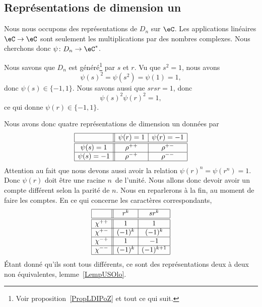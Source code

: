 \subsection{Représentations de dimension un}

Nous nous occupons des représentations de \( D_n\) sur \( \eC\). Les applications linéaires \( \eC\to \eC\) sont seulement les multiplications par des nombres complexes. Nous cherchons donc \( \psi\colon D_n\to \eC^*\).

Nous savons que \( D_n\) est généré\footnote{Voir proposition~\ref{PropLDIPoZ} et tout ce qui suit.} par \( s\) et \( r\). Vu que \( s^2=1\), nous avons
\begin{equation}
    \psi(s)^2=\psi(s^2)=\psi(1)=1,
\end{equation}
donc \( \psi(s)\in\{ -1,1 \}\). Nous savons aussi que \( srsr=1\), donc
\begin{equation}
    \psi(s)^2\psi(r)^2=1,
\end{equation}
ce qui donne \( \psi(r)\in\{ -1,1 \}\).

Nous avons donc quatre représentations de dimension un données par
\begin{equation*}
    \begin{array}[]{|c||c|c|}
        \hline
        &\psi(r)=1&\psi(r)=-1\\
        \hline\hline
        \psi(s)=1&\rho^{++}&\rho^{+-}\\
        \hline
        \psi(s)=-1&\rho^{-+}&\rho^{--}\\
        \hline
    \end{array}
\end{equation*}
Attention au fait que nous devons aussi avoir la relation \( \psi(r)^n=\psi(r^n)=1\). Donc \( \psi(r)\) doit être une racine \( n\)\ieme\ de l'unité. Nous allons donc devoir avoir un compte différent selon la parité de \( n\). Nous en reparlerons à la fin, au moment de faire les comptes. En ce qui concerne les caractères correspondants,
\begin{equation*}
    \begin{array}[]{|c||c|c|}
        \hline
        &r^k&sr^k\\
        \hline\hline
        \chi^{++}&1&1\\
        \hline
        \chi^{+-}&(-1)^k&(-1)^k\\
        \hline
        \chi^{-+}&1&-1\\
        \hline
        \chi^{--}&(-1)^k&(-1)^{k+1}\\
        \hline
    \end{array}
\end{equation*}
Étant donné qu'ils sont tous différents, ce sont des représentations deux à deux non équivalentes, lemme~\ref{LempUSOlo}.

